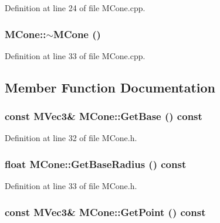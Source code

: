 Definition at line 24 of file MCone.cpp.\hypertarget{class_m_cone_5e54b9069d7d019da93478b2598c4521}{
\subsubsection[{$\sim$MCone}]{\setlength{\rightskip}{0pt plus 5cm}MCone::$\sim$MCone ()}}
\label{class_m_cone_5e54b9069d7d019da93478b2598c4521}




Definition at line 33 of file MCone.cpp.

\subsection{Member Function Documentation}
\hypertarget{class_m_cone_26a50da3857abe745450c04db852f8ea}{
\subsubsection[{GetBase}]{\setlength{\rightskip}{0pt plus 5cm}const {\bf MVec3}\& MCone::GetBase () const}}
\label{class_m_cone_26a50da3857abe745450c04db852f8ea}




Definition at line 32 of file MCone.h.\hypertarget{class_m_cone_45c5c6ee9070a98eebd31e2348c33df7}{
\subsubsection[{GetBaseRadius}]{\setlength{\rightskip}{0pt plus 5cm}float MCone::GetBaseRadius () const}}
\label{class_m_cone_45c5c6ee9070a98eebd31e2348c33df7}




Definition at line 33 of file MCone.h.\hypertarget{class_m_cone_e207ab247ef75f4e45cbe8bd703cb261}{
\subsubsection[{GetPoint}]{\setlength{\rightskip}{0pt plus 5cm}const {\bf MVec3}\& MCone::GetPoint () const}}
\label{class_m_cone_e207ab247ef75f4e45cbe8bd703cb261}




